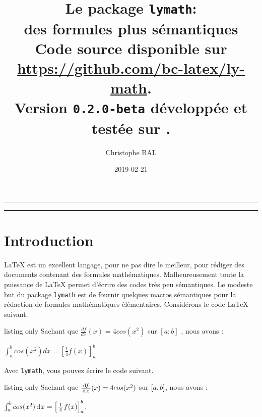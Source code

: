 \documentclass[12pt,a4paper]{scrartcl}
\theoremstyle{definition}
\begin{document}
\renewcommand\labelitemi{\raisebox{0.125em}{\tiny\textbullet}}
\renewcommand{\labelitemii}{---}

\title{%
	Le package \texttt{lymath}:\\%
	des formules plus sémantiques\\%
	{\footnotesize Code source disponible sur \url{https://github.com/bc-latex/ly-math}.}\\%
{\footnotesize Version \texttt{0.2.0-beta} développée et testée sur \macosxname{}.}%
}
\author{Christophe BAL}
\date{2019-02-21}

\maketitle


\vspace{2em}

\hrule

\tableofcontents

\vspace{1.5em}

\hrule

\newpage



\section{Introduction}

\LaTeX{} est un excellent langage, pour ne pas dire le meilleur, pour rédiger des documents contenant des formules mathématiques.
Malheureusement toute la puissance de \LaTeX{} permet d'écrire des codes très peu sémantiques.
Le modeste but du package \verb+lymath+ est de fournir quelques macros sémantiques pour la rédaction de formules mathématiques élémentaires. Considérons le code \LaTeX{} suivant.

\begin{tcblisting}{listing only}
Sachant que $\frac{df}{dx}(x) = 4 cos(x^2)$ sur $[a ; b]$ , nous avons :

$\int_a^b cos(x^2) dx = \left[ \frac{1}{4} f(x) \right]_a^b$.
\end{tcblisting}


Avec \verb+lymath+, vous pouvez écrire le code suivant.

\begin{tcblisting}{listing only}
Sachant que $\derfrac{f}{x}(x) = 4 cos(x^2)$ sur $\intervalC{a}{b}$, nous avons :

$\int_a^b cos(x^2) \dd{x} = \hook{\frac{1}{4} f(x)}{a}{b}$.
\end{tcblisting}
\end{document}
